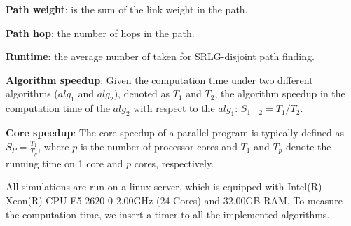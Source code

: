 %
%

\textbf{Path weight}: is the sum of the link weight in the path.


 \textbf{Path hop}: the number of hops in the path.

\textbf{Runtime}: the average number of  taken for SRLG-disjoint path finding.


\textbf{Algorithm speedup}: Given the computation time under two different  algorithms ($alg_1$ and $alg_2$), denoted as $T_1$ and $T_2$, the algorithm speedup in the computation time of the $alg_2$ with respect to the $alg_1$: ${S_{1 - 2}} = T_1/T_2$.


 \textbf{Core speedup}: The core speedup \cite{grama2003introduction} of a parallel program is typically defined as $S_P=\frac{T_1}{T_p}$,
where $p$ is the number of processor cores and $T_1$ and $T_p$ denote the running time on 1 core and $p$ cores, respectively.






All simulations are run on a linux server, which is equipped with Intel(R) Xeon(R) CPU E5-2620 0 \@ 2.00GHz (24 Cores) and 32.00GB RAM. To measure the computation time, we insert a timer to all the implemented algorithms.
%

